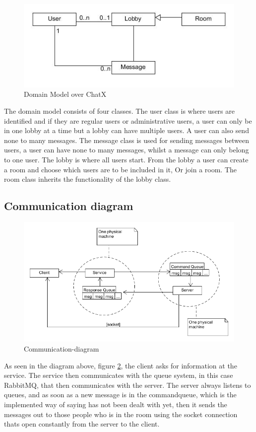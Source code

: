 \begin{figure}[H]
\centering
\includegraphics[width=0.7\linewidth]{img/DomainModelChatX}
\caption{Domain Model over ChatX}
\label{fig:DomainModelChatX}
\end{figure}

The domain model consists of four classes. The user class is where users are identified and if they are regular users or administrative users, a user can only be in one lobby at a time but a lobby can have multiple users. A user can also send none to many messages. The message class is used for sending messages between users, a user can have none to many messages, whilst a message can only belong to one user. The lobby is where all users start. From the lobby a user can create a room and choose which users are to be included in it, Or join a room. The room class inherits the functionality of the lobby class.

\subsection{Communication diagram}

\begin{figure}[h]
\centering
\includegraphics[width=0.7\linewidth]{img/CommunicationDiag}
\caption[Communication-diagram]{Communication-diagram}
\label{fig:Communicationdiagram}
\end{figure}

As seen in the diagram above, figure \ref{fig:Communicationdiagram}, the client asks for information at the service. The service then communicates with the queue system, in this case RabbitMQ, that then communicates with the server. The server always listens to queues, and as soon as a new message is in the commandqueue, which is the implemented way of saying has not been dealt with yet, then it sends the messages out to those people who is in the room using the socket connection thats open constantly from the server to the client.
